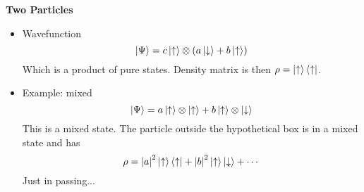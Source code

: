 \documentclass[11pt, a4paper]{article}
\newcommand{\ua}{\uparrow}  %
\newcommand{\da}{\downarrow}  %
\begin{document}
\textbf{Two Particles}
\begin{itemize}
    \item Wavefunction 
    \begin{equation*}
        \ket{\Psi} = c \ket{\ua} \otimes \left( a \ket{\da} + b \ket{\ua} \right)
    \end{equation*}
    Which is a product of pure states. Density matrix is then $ \rho = \ket{\ua}\bra{\ua} $. 

    \item Example: mixed
    \begin{equation*}
        \ket{\Psi} = a \ket{\ua} \otimes \ket{\ua} + b \ket{\ua} \otimes \ket{\da}
    \end{equation*}
    This is a mixed state. The particle outside the hypothetical box is in a mixed state and has 
    \begin{equation*}
        \rho = \abs{a}^{2} \ket{\ua} \bra{\ua} + \abs{b}^{2} \ket{\ua}\ket{\da} + \cdots 
    \end{equation*}
    Just in passing...
    
    
\end{itemize}
\end{document}
